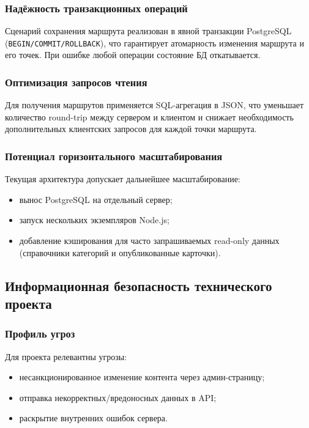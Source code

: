 \subsubsection{Надёжность транзакционных операций}
Сценарий сохранения маршрута реализован в явной транзакции PostgreSQL
(\texttt{BEGIN/COMMIT/ROLLBACK}), что гарантирует атомарность изменения маршрута
и его точек. При ошибке любой операции состояние БД откатывается.

\subsubsection{Оптимизация запросов чтения}
Для получения маршрутов применяется SQL-агрегация в JSON, что уменьшает
количество round-trip между сервером и клиентом и снижает необходимость
дополнительных клиентских запросов для каждой точки маршрута.

\subsubsection{Потенциал горизонтального масштабирования}
Текущая архитектура допускает дальнейшее масштабирование:
\begin{itemize}
	\item вынос PostgreSQL на отдельный сервер;
	\item запуск нескольких экземпляров Node.js;
	\item добавление кэширования для часто запрашиваемых read-only данных
	(справочники категорий и опубликованные карточки).
\end{itemize}

\subsection{Информационная безопасность технического проекта}

\subsubsection{Профиль угроз}
Для проекта релевантны угрозы:
\begin{itemize}
	\item несанкционированное изменение контента через админ-страницу;
	\item отправка некорректных/вредоносных данных в API;
	\item раскрытие внутренних ошибок сервера.
\end{itemize}

